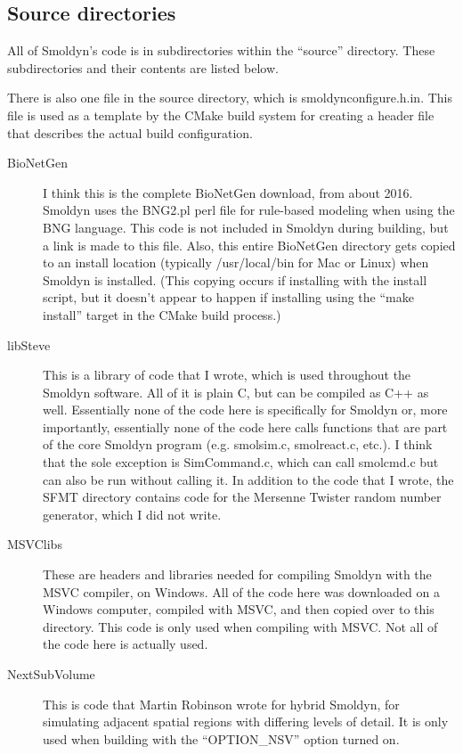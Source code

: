 \documentclass {book}
\begin{document}
\subsection{Source directories}

All of Smoldyn's code is in subdirectories within the ``source'' directory. These subdirectories and their contents are listed below.

There is also one file in the source directory, which is smoldynconfigure.h.in. This file is used as a template by the CMake build system for creating a header file that describes the actual build configuration.

\begin{description}

\item[BioNetGen] I think this is the complete BioNetGen download, from about 2016. Smoldyn uses the BNG2.pl perl file for rule-based modeling when using the BNG language. This code is not included in Smoldyn during building, but a link is made to this file. Also, this entire BioNetGen directory gets copied to an install location (typically /usr/local/bin for Mac or Linux) when Smoldyn is installed. (This copying occurs if installing with the install script, but it doesn't appear to happen if installing using the ``make install'' target in the CMake build process.)

\item[libSteve] This is a library of code that I wrote, which is used throughout the Smoldyn software. All of it is plain C, but can be compiled as C++ as well. Essentially none of the code here is specifically for Smoldyn or, more importantly, essentially none of the code here calls functions that are part of the core Smoldyn program (e.g. smolsim.c, smolreact.c, etc.). I think that the sole exception is SimCommand.c, which can call smolcmd.c but can also be run without calling it. In addition to the code that I wrote, the SFMT directory contains code for the Mersenne Twister random number generator, which I did not write.

\item[MSVClibs] These are headers and libraries needed for compiling Smoldyn with the MSVC compiler, on Windows. All of the code here was downloaded on a Windows computer, compiled with MSVC, and then copied over to this directory. This code is only used when compiling with MSVC. Not all of the code here is actually used.

\item[NextSubVolume] This is code that Martin Robinson wrote for hybrid Smoldyn, for simulating adjacent spatial regions with differing levels of detail. It is only used when building with the ``OPTION\_NSV'' option turned on.


\end{description}
\end{document}
